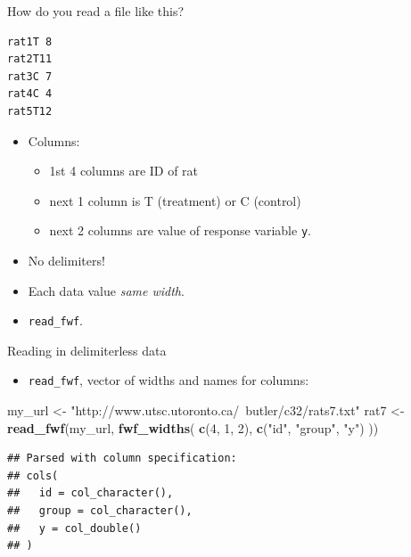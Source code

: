\documentclass[
  ignorenonframetext,
]{beamer}
\newenvironment{Shaded}{\begin{snugshade}}{\end{snugshade}}
\newcommand{\DecValTok}[1]{\textcolor[rgb]{0.00,0.00,0.81}{#1}}
\newcommand{\KeywordTok}[1]{\textcolor[rgb]{0.13,0.29,0.53}{\textbf{#1}}}
\newcommand{\NormalTok}[1]{#1}
\newcommand{\StringTok}[1]{\textcolor[rgb]{0.31,0.60,0.02}{#1}}
\providecommand{\tightlist}{%
  \setlength{\itemsep}{0pt}\setlength{\parskip}{0pt}}
\begin{document}
\begin{frame}[fragile]{How do you read a file like this?}
\protect\hypertarget{how-do-you-read-a-file-like-this}{}

\begin{verbatim}
rat1T 8
rat2T11
rat3C 7
rat4C 4
rat5T12
\end{verbatim}

\begin{itemize}
\tightlist
\item
  Columns:

  \begin{itemize}
  \tightlist
  \item
    1st 4 columns are ID of rat
  \item
    next 1 column is T (treatment) or C (control)
  \item
    next 2 columns are value of response variable \texttt{y}.
  \end{itemize}
\item
  No delimiters!
\item
  Each data value \emph{same width}.
\item
  \texttt{read\_fwf}.
\end{itemize}

\end{frame}

\begin{frame}[fragile]{Reading in delimiterless data}
\protect\hypertarget{reading-in-delimiterless-data}{}

\begin{itemize}
\tightlist
\item
  \texttt{read\_fwf}, vector of widths and names for columns:
\end{itemize}

\begin{Shaded}
\begin{Highlighting}[]
\NormalTok{my_url <-}\StringTok{ "http://www.utsc.utoronto.ca/~butler/c32/rats7.txt"}
\NormalTok{rat7 <-}\StringTok{ }\KeywordTok{read_fwf}\NormalTok{(my_url, }\KeywordTok{fwf_widths}\NormalTok{(}
  \KeywordTok{c}\NormalTok{(}\DecValTok{4}\NormalTok{, }\DecValTok{1}\NormalTok{, }\DecValTok{2}\NormalTok{),}
  \KeywordTok{c}\NormalTok{(}\StringTok{"id"}\NormalTok{, }\StringTok{"group"}\NormalTok{, }\StringTok{"y"}\NormalTok{)}
\NormalTok{))}
\end{Highlighting}
\end{Shaded}

\begin{verbatim}
## Parsed with column specification:
## cols(
##   id = col_character(),
##   group = col_character(),
##   y = col_double()
## )
\end{verbatim}

\end{frame}
\end{document}
